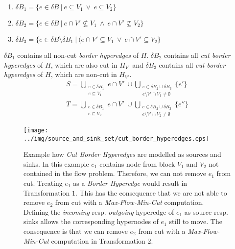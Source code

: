 \begin{enumerate}
\item $\delta B_1 = \{ e \in \delta B \ |\ e \subseteq V_1\ \lor\ e \subseteq V_2 \}$
\item $\delta B_2 = \{ e \in \delta B \ |\ e \cap V' \not\subseteq V_1\ \land\ e \cap V' \not\subseteq V_2\}$
\item $\delta B_3 = \{ e \in \delta B \setminus \delta B_1 \ |\ (e \cap V' \subseteq V_1\ \lor\ e \cap V' \subseteq V_2 \}$
\end{enumerate}

$\delta B_1$ contains all non-cut \emph{border hyperedges} of $H$. $\delta B_2$ contains 
all \emph{cut border hyperedges} of $H$, which are also cut in $H_{V'}$ and $\delta B_3$ contains
all \emph{cut border hyperedges} of $H$, which are non-cut in $H_{V'}$.
\begin{align}
S = \bigcup\limits_{\substack{e \in \delta B_1 \\ e \subseteq V_1}} e\cap V'\ \cup \bigcup\limits_{\substack{e \in \delta B_2 \cup \delta B_3 \\ e \setminus V' \cap V_1 \neq \emptyset}} \{e'\} \label{S_final_border_hyperedges}\\
T = \bigcup\limits_{\substack{e \in \delta B_1 \\ e \subseteq V_2}} e\cap V'\ \cup \bigcup\limits_{\substack{e \in \delta B_2 \cup \delta B_3 \\ e \setminus V' \cap V_2 \neq \emptyset}} \{e''\} \label{T_final_border_hyperedges}
\end{align}

\begin{figure}
\centering
\texttt{[image: ../img/source\_and\_sink\_set/cut\_border\_hyperedges.eps]}
\caption{Example how \emph{Cut Border Hyperedges} are modelled as sources and sinks. In this
         example $e_1$ contains node from block $V_1$ and $V_2$ not contained in the flow problem. Therefore,
         we can not remove $e_1$ from cut. Treating $e_1$ as a \emph{Border Hyperedge} would result
         in Transformation $1$. This has the consequence that we are not able to remove $e_2$
         from cut with a \emph{Max-Flow-Min-Cut} computation. Defining the \emph{incoming} resp.
         \emph{outgoing} hyperedge of $e_1$ as source resp. sinks allows the corresponding hypernodes
         of $e_1$ still to move. The consequence is that we can remove $e_2$ from cut with a
         \emph{Max-Flow-Min-Cut} computation in Transformation $2$.}
\label{img:cut_border_hyperedges}
\end{figure}

